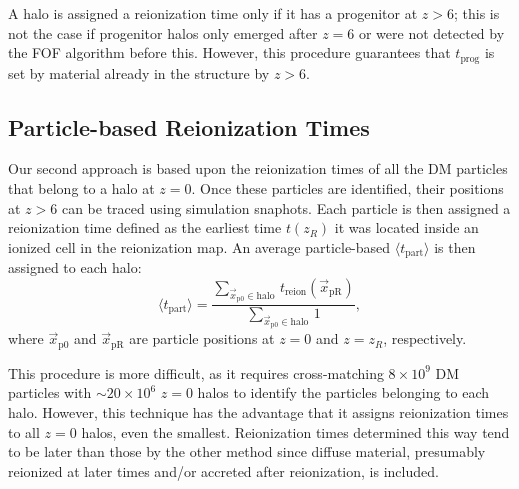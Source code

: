 \documentclass[twocolumn]{aastex61}
\begin{document}
A halo is assigned a reionization time only if it has a progenitor at $z > 6$; this is not the case if progenitor halos only emerged after $z = 6$ or were not detected by the FOF algorithm before this. %
However, this procedure guarantees that $t_\mathrm{prog}$ is set by material already in the structure by $z > 6$. 


\subsection{Particle-based Reionization Times}
Our second approach is based upon the reionization times of all the DM particles that belong to a halo at $z = 0$.
 Once these particles are identified, their positions at $z > 6$ can be traced using simulation snaphots. Each particle is then assigned a reionization time defined as the earliest time $t(z_R)$ it was located inside an ionized cell in the reionization map. An average particle-based $\langle t_\mathrm{part} \rangle$ 
 is then assigned to each halo:
\begin{equation}
\langle t_\mathrm{part}\rangle=\frac{\sum_{\vec x_\mathrm{p0} \in \mathrm{halo} \ } t_\mathrm{reion}(\vec x_\mathrm{pR})}{\sum_{\vec x_\mathrm{p0} \in \mathrm{halo} \ } 1},
\end{equation}
where $\vec x_\mathrm{p0}$ and $\vec x_\mathrm{pR}$ are 
particle positions at $z = 0$ and $z = z_R$, respectively.

This procedure is more difficult, as it requires cross-matching $8\times 10^9$ DM particles with $\sim 20\times 10^6$ $z = 0$ halos to identify the particles belonging to each halo. 
However, this technique has the advantage that it assigns reionization times to all $z = 0$ halos, even the smallest. Reionization times determined this way tend to be later than those by the other method since diffuse material, presumably reionized at later times and/or accreted after reionization, is included.
 
\end{document}
